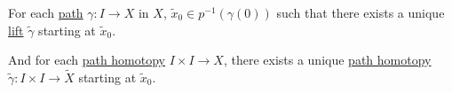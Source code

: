 \begin{corollary}\label{col:path-lifting-property}
	For each \hyperref[def:path]{path} \(\gamma \colon I\to X\) in \(X\), \(\widetilde{x} _0\in p^{-1} (\gamma (0)) \) such that there exists a
	unique \hyperref[def:lift]{lift} \(\widetilde{\gamma} \) starting at \(\widetilde{x} _0\).

	\par And for each \hyperref[def:homotopy-path]{path homotopy} \(I\times I\to X\), there exists a unique \hyperref[def:homotopy-path]{path homotopy}
	\(\widetilde{\gamma} \colon I\times I\to \widetilde{X} \) starting at \(\widetilde{x}_0\).
	\begin{figure}[H]
		\centering
		\label{fig:col:lec14:1}
	\end{figure}
\end{corollary}
